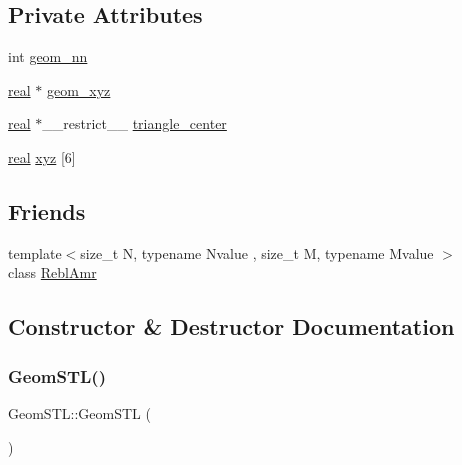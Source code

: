\subsection*{Private Attributes}
\begin{DoxyCompactItemize}
\item 
int \mbox{\hyperlink{classGeomSTL_ae5999187224ca4a905f6281f83ad10d4}{geom\+\_\+nn}}
\item 
\mbox{\hyperlink{definitions_8h_aedc0ad84d1e764530814f57ad931d02a}{real}} $\ast$ \mbox{\hyperlink{classGeomSTL_aa042c614009a5473c8bd34bf6cda0561}{geom\+\_\+xyz}}
\item 
\mbox{\hyperlink{definitions_8h_aedc0ad84d1e764530814f57ad931d02a}{real}} $\ast$\+\_\+\+\_\+restrict\+\_\+\+\_\+ \mbox{\hyperlink{classGeomSTL_a090ec3d4d4a5be7eb0a0874ce91b07a3}{triangle\+\_\+center}}
\item 
\mbox{\hyperlink{definitions_8h_aedc0ad84d1e764530814f57ad931d02a}{real}} \mbox{\hyperlink{classGeomSTL_a38716d8c3db44ebc059e020d2ce926b2}{xyz}} \mbox{[}6\mbox{]}
\end{DoxyCompactItemize}
\subsection*{Friends}
\begin{DoxyCompactItemize}
\item 
{\footnotesize template$<$size\+\_\+t N, typename Nvalue , size\+\_\+t M, typename Mvalue $>$ }\\class \mbox{\hyperlink{classGeomSTL_a8d90a8b4dd53f0733e15d6eed6d2dcdd}{Rebl\+Amr}}
\end{DoxyCompactItemize}


\subsection{Constructor \& Destructor Documentation}
\mbox{\label{classGeomSTL_a90b2b4613d18ae27f53393233b063207}} 
\subsubsection{\texorpdfstring{Geom\+S\+T\+L()}{GeomSTL()}}
{\footnotesize\ttfamily Geom\+S\+T\+L\+::\+Geom\+S\+TL (\begin{DoxyParamCaption}{ }\end{DoxyParamCaption})\hspace{0.3cm}{\ttfamily [inline]}}




